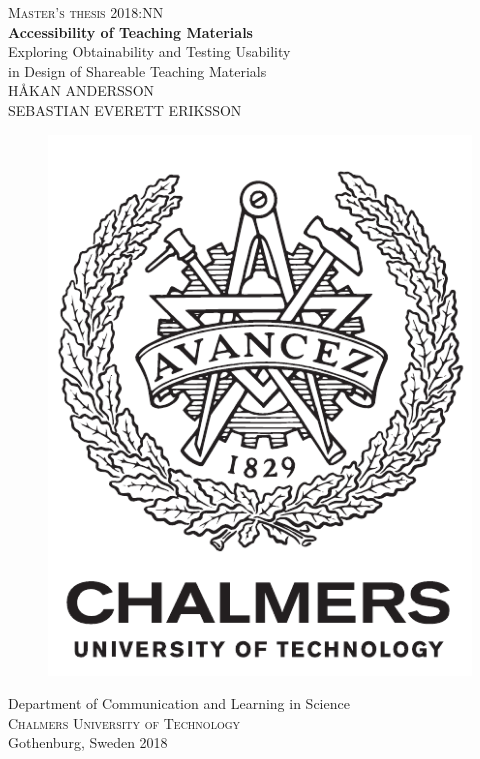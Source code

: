 \newpage
\thispagestyle{empty}
\begin{center}
	\textsc{\large Master's thesis 2018:NN}\\[4cm]		%
	\textbf{\Large Accessibility of Teaching Materials} \\[1cm]
	{\large Exploring Obtainability and Testing Usability \\[0.1cm] in Design of Shareable Teaching Materials}\\[1cm]
	{\large HÅKAN ANDERSSON \\[0.1cm] SEBASTIAN EVERETT ERIKSSON}
	
	\vfill	
	\begin{figure}[H]
	\centering
	\includegraphics[width=0.2\pdfpagewidth]{figure/auxiliary/logo_eng.pdf} \\	
	\end{figure}	\vspace{5mm}	
	
	Department of Communication and Learning in Science \\
	\textsc{Chalmers University of Technology} \\
	Gothenburg, Sweden 2018 \\
\end{center}


